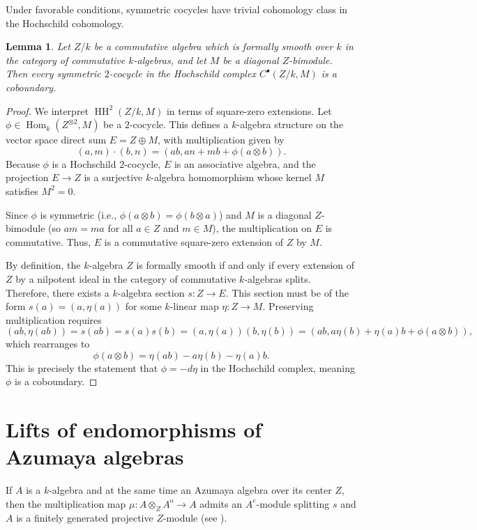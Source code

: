 \documentclass[a4paper,11pt,reqno]{amsart}%
\newtheorem{lemma}[theorem]{Lemma}
\theoremstyle{definition}
\newcommand{\HH}{\operatorname{HH}}
\newcommand{\op}{{\operatorname{o}}}
\newcommand{\<}{\<}
\renewcommand{\>}{\>}
\numberwithin{equation}{subsection}
\begin{document}
Under favorable conditions, symmetric cocycles have trivial cohomology class in the Hochschild cohomology.

\begin{lemma}\label{lemma:formallysmooth}
Let $Z/k$ be a commutative algebra which is formally smooth over $k$ in the category of commutative $k$-algebras, and let $M$ be a diagonal $Z$-bimodule. Then every symmetric
$2$-cocycle in the Hochschild complex $C^\bullet(Z/k, M)$ is a
coboundary.
\end{lemma}

\begin{proof}
We interpret $\HH^2(Z/k, M)$ in terms of square-zero extensions. Let $\phi \in \operatorname{Hom}_k(Z^{\otimes 2}, M)$ be a $2$-cocycle. 
This defines a $k$-algebra structure on the vector space direct sum $E = Z \oplus M$, with multiplication given by
$$(a, m) \cdot (b, n) = (ab, a n + m b + \phi(a \otimes b)).$$
Because $\phi$ is a Hochschild $2$-cocycle, $E$ is an associative algebra, and the projection $E \to Z$ 
is a surjective $k$-algebra homomorphism whose kernel $M$ satisfies $M^2 = 0$.

Since $\phi$ is symmetric (i.e., $\phi(a \otimes b) = \phi(b \otimes a)$) and $M$ is a diagonal $Z$-bimodule (so $am = ma$ for all $a\in Z$ and $m\in M$), 
the multiplication on $E$ is commutative. Thus, $E$ is a commutative square-zero extension of $Z$ by $M$.

By definition, the $k$-algebra $Z$ is formally smooth if and only if every extension of $Z$ by a nilpotent ideal in the category of commutative $k$-algebras splits. Therefore, there exists a $k$-algebra section $s \colon Z \to E$. This section must be of the form $s(a) = (a, \eta(a))$ for some $k$-linear map $\eta \colon Z \to M$. Preserving multiplication requires
$$(ab, \eta(ab)) = s(ab) = s(a)s(b) = (a, \eta(a))(b, \eta(b)) = (ab, a\eta(b) + \eta(a)b + \phi(a \otimes b)),$$
which rearranges to
$$\phi(a \otimes b) = \eta(ab) - a\eta(b) - \eta(a)b.$$
This is precisely the statement that $\phi = -d\eta$ in the Hochschild complex, meaning $\phi$ is a coboundary.
\end{proof}

\section{Lifts of endomorphisms of Azumaya algebras}


If $A$ is a $k$-algebra and at the same time an Azumaya algebra over its center $Z$, then the multiplication map 
$\mu: A\otimes_Z A^\op \rightarrow A$ admits an $A^e$-module splitting $s$
and $A$ is a finitely generated projective $Z$-module (see \cite[III, Th\'eor\`eme 5.1, Th\'eor\`eme 1.4]{KnusOjanguren}). 
\end{document}
